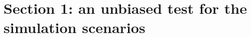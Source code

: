 \documentclass[a4paper]{article}\usepackage[]{graphicx}\usepackage[]{color}
\begin{document}
%
%
%



\section{Section 1: an unbiased test for the simulation scenarios}
\end{document}
